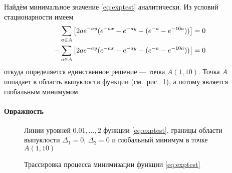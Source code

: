 Найдём минимальное значение \eqref{eq:exptest} аналитически. Из
условий стационарности имеем
\begin{equation*}
  \begin{aligned}
    &\sum\limits_{a\in A}\left[2ae^{-ay}(e^{-ax}-e^{-ay}-(e^{-a}-e^{-10a}))\right] = 0\\
    -&\sum\limits_{a\in A}\left[2ae^{-ay}(e^{-ax}-e^{-ay}-(e^{-a}-e^{-10a}))\right] = 0
  \end{aligned}
\end{equation*}
откуда определяется единственное решение — точка $A (1,10)$. Точка $A$
попадает в область выпуклости функции
(см. рис. \ref{fig:exptest-convexity}), а потому является глобальным
минимумом.

\paragraph{Овражность}

\begin{figure}[]
  \centering
  \caption[Экспоненциальная функция]{Линии уровней $0.01,\dotsc,2$
    функции \eqref{eq:exptest}, границы области выпуклости
    $\Delta_1=0$, $\Delta_2=0$ и глобальный минимум в точке $A(1,
    10)$}
  \label{fig:exptest-convexity}
\end{figure}

\begin{figure}[thb]
  \centering
  \caption[\relch{} на экспоненциальной функции]{Трассировка процесса
    минимизации функции \eqref{eq:exptest}}
\end{figure}

